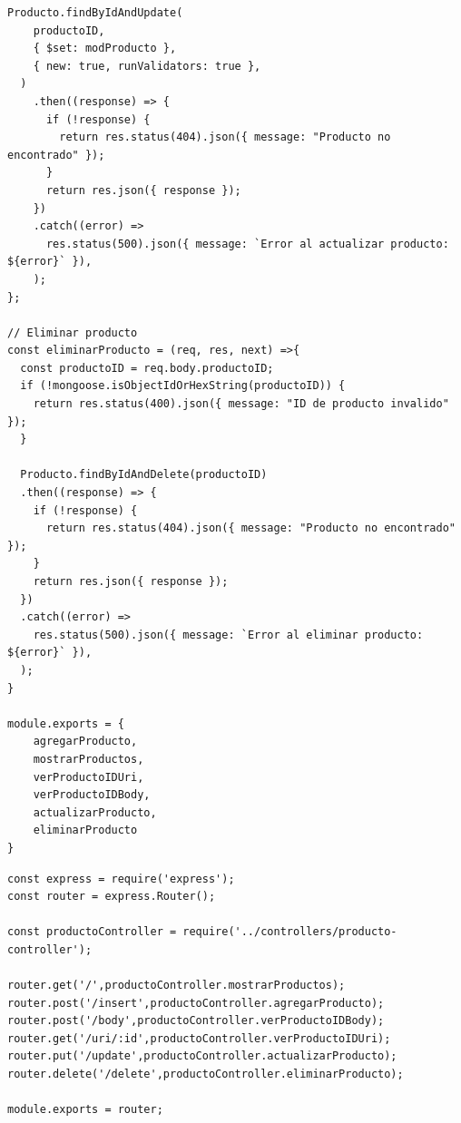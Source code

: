 \begin{lstlisting}[caption={Controlador de Producto (controllers/producto-controller.js)}]
  Producto.findByIdAndUpdate(
    productoID,
    { $set: modProducto },
    { new: true, runValidators: true },
  )
    .then((response) => {
      if (!response) {
        return res.status(404).json({ message: "Producto no encontrado" });
      }
      return res.json({ response });
    })
    .catch((error) =>
      res.status(500).json({ message: `Error al actualizar producto: ${error}` }),
    );
};

// Eliminar producto
const eliminarProducto = (req, res, next) =>{
  const productoID = req.body.productoID;
  if (!mongoose.isObjectIdOrHexString(productoID)) {
    return res.status(400).json({ message: "ID de producto invalido" });
  }

  Producto.findByIdAndDelete(productoID)
  .then((response) => {
    if (!response) {
      return res.status(404).json({ message: "Producto no encontrado" });
    }
    return res.json({ response });
  })
  .catch((error) =>
    res.status(500).json({ message: `Error al eliminar producto: ${error}` }),
  );
}

module.exports = {
    agregarProducto,
    mostrarProductos,
    verProductoIDUri,
    verProductoIDBody,
    actualizarProducto,
    eliminarProducto
}
\end{lstlisting}

\begin{lstlisting}[caption={Rutas de Producto (routes/producto-router.js)}]
const express = require('express');
const router = express.Router();

const productoController = require('../controllers/producto-controller');

router.get('/',productoController.mostrarProductos);
router.post('/insert',productoController.agregarProducto);
router.post('/body',productoController.verProductoIDBody);
router.get('/uri/:id',productoController.verProductoIDUri);
router.put('/update',productoController.actualizarProducto);
router.delete('/delete',productoController.eliminarProducto);

module.exports = router;
\end{lstlisting}

